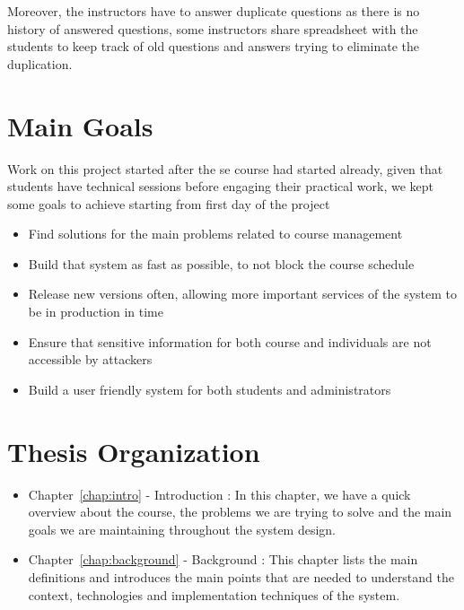 \newParagraph
Moreover, the instructors have to answer duplicate questions as there is no history of answered questions, some instructors share
spreadsheet with the students to keep track of old questions and answers trying to eliminate the duplication.

\section{Main Goals}
\label{sec:main-goals}
Work on this project started after the \ac{se} course had started already, given that students have technical sessions before
engaging their practical work, we kept some goals to achieve starting from first day of the project
\begin{itemize}
  \item Find solutions for the main problems related to course management
  \item Build that system as fast as possible, to not block the course schedule
  \item Release new versions often, allowing more important services of the system to be in production in time
  \item Ensure that sensitive information for both course and individuals are not accessible by attackers
  \item Build a user friendly system for both students and administrators
\end{itemize}

\section{Thesis Organization}
\label{sec:thesis-organization}
\begin{itemize}
  \item Chapter~\ref{chap:intro} - Introduction : In this chapter, we have a quick overview about the course, the problems
  we are trying to solve and the main goals we are maintaining throughout the system design.
  \item Chapter~\ref{chap:background} - Background : This chapter lists the main definitions and introduces the main points that
  are needed to understand the context, technologies and implementation techniques of the system.
\end{itemize}
